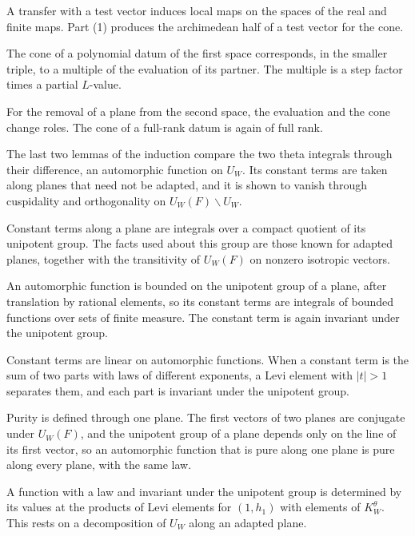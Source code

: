 A transfer with a test vector induces local maps on the spaces of the real
and finite maps. Part (1) produces the archimedean half of a test vector for
the cone.

The cone of a polynomial datum of the first space corresponds, in the smaller
triple, to a multiple of the evaluation of its partner. The multiple is a step
factor times a partial $L$-value.

For the removal of a plane from the second space, the evaluation and the cone
change roles. The cone of a full-rank datum is again of full rank.

The last two lemmas of the induction compare the two theta integrals through
their difference, an automorphic function on $U_W$. Its constant terms are
taken along planes that need not be adapted, and it is shown to vanish through
cuspidality and orthogonality on $U_W(F)\backslash U_W$.

Constant terms along a plane are integrals over a compact quotient of its
unipotent group. The facts used about this group are those known for adapted
planes, together with the transitivity of $U_W(F)$ on nonzero isotropic
vectors.

An automorphic function is bounded on the unipotent group of a plane, after
translation by rational elements, so its constant terms are integrals of
bounded functions over sets of finite measure. The constant term is again
invariant under the unipotent group.

Constant terms are linear on automorphic functions. When a constant term is
the sum of two parts with laws of different exponents, a Levi element with
$|t|>1$ separates them, and each part is invariant under the unipotent group.

Purity is defined through one plane. The first vectors of two planes are
conjugate under $U_W(F)$, and the unipotent group of a plane depends only on
the line of its first vector, so an automorphic function that is pure along
one plane is pure along every plane, with the same law.

A function with a law and invariant under the unipotent group is determined by
its values at the products of Levi elements for $(1,h_1)$ with elements of
$K^\theta_W$. This rests on a decomposition of $U_W$ along an adapted plane.

